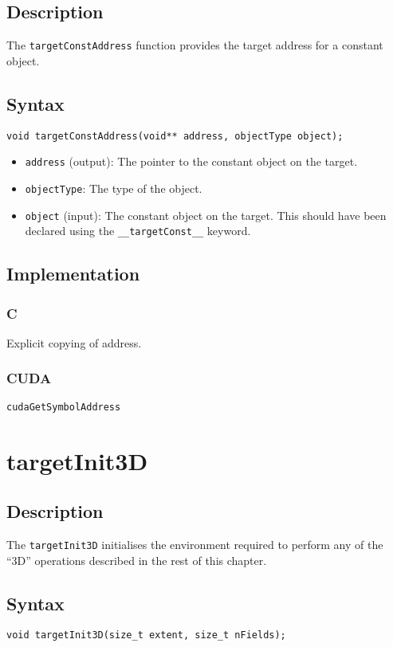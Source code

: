 \subsection{Description}

The \verb+targetConstAddress+ function provides the target address for a constant object.

\subsection{Syntax}
\begin{verbatim}
void targetConstAddress(void** address, objectType object);
\end{verbatim}

\begin{itemize}
\item \verb+address+ (output): The pointer to the constant object on the target.
\item \verb+objectType+: The type of the object.
\item \verb+object+ (input): The constant object on the target. This should have been declared using the \verb+__targetConst__+ keyword.
\end{itemize}

\subsection{Implementation}
\subsubsection{C}
Explicit copying of address.
\subsubsection{CUDA}
\verb+cudaGetSymbolAddress+

\newpage
\section{targetInit3D}

\subsection{Description}

The \verb+targetInit3D+ initialises the environment required to perform any of the ``3D'' operations described in the rest of this chapter.

\subsection{Syntax}
\begin{verbatim}
void targetInit3D(size_t extent, size_t nFields);
\end{verbatim}

